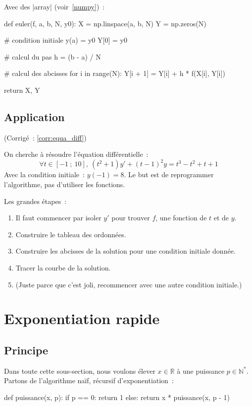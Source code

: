 		Avec des \python|array| (voir~\ref{numpy})~:
		\begin{pythoncode}
			def euler(f, a, b, N, y0):		
				X = np.linspace(a, b, N)
				Y = np.zeros(N)
				
				# condition initiale y(a) = y0
				Y[0] = y0
				
				# calcul du pas
				h = (b - a) / N
				
				# calcul des abcisses
				for i in range(N):
					Y[i + 1] = Y[i] + h * f(X[i], Y[i])
				
				return X, Y
		\end{pythoncode}
	
	\subsection{Application} \label{appl:equa_diff} (Corrigé~: \ref{corr:equa_diff})
		
		On cherche à résoudre l'équation différentielle~:
		\[
			\forall t \in [-1~;\ 10],\ (t^2 + 1)y' + (t - 1)^2y = t^3 - t^2 + t + 1
		\]
		Avec la condition initiale~: $y(-1) = 8$.
		Le but est de reprogrammer l'algorithme, pas d'utiliser les fonctions.
		
		Les grandes étapes~:
		\begin{enumerate}
			\item Il faut commencer par isoler $y'$ pour trouver $f$, une fonction de $t$ et de $y$.
			\item Construire le tableau des ordonnées.
			\item Construire les abcisses de la solution pour une condition initiale donnée.
			\item Tracer la courbe de la solution.
			\item (Juste parce que c'est joli, recommencer avec une autre condition initiale.)
		\end{enumerate}

\section{Exponentiation rapide}
	
	\subsection{Principe}
		
		Dans toute cette sous-section, nous voulons élever $x \in \mathbb{R}$ à une puissance $p \in \mathbb{N}^*$. Partons de l'algorithme naïf, récursif d'exponentiation~:
		\begin{pythoncode}
			def puissance(x, p):
				if p == 0: return 1
				else: return x * puissance(x, p - 1)
		\end{pythoncode}
		
